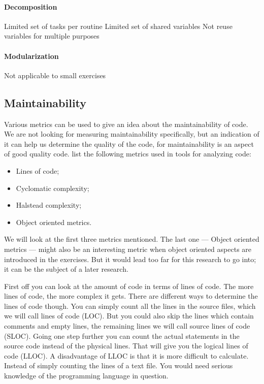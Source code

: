 \paragraph{Decomposition}
Limited set of tasks per routine
Limited set of shared variables
Not reuse variables for multiple purposes

\paragraph{Modularization}
Not applicable to small exercises

\subsection{Maintainability}

Various metrics can be used to give an idea about the maintainability of
code. We are not looking for measuring maintainability specifically, but an
indication of it can help us determine the quality of the code, for
maintainability is an aspect of good quality code. \citet{rakic2013problems}
list the following metrics used in tools for analyzing code:
\begin{itemize}
  \item Lines of code;
  \item Cyclomatic complexity;
  \item Halstead complexity;
  \item Object oriented metrics.
\end{itemize}
We will look at the first three metrics mentioned. The last one --- Object
oriented metrics --- might also be an interesting metric when object oriented
aspects are introduced in the exercises. But it would lead too far for this
research to go into; it can be the subject of a later research.

First off you can look at the amount of code in terms of lines of code.
The more lines of code, the more complex it gets. There are different
ways to determine the lines of code though.
You can simply count all the lines in the
source files, which we will call lines of code (LOC). But you could also skip
the lines which contain comments and empty lines, the remaining lines we will
call source lines of code (SLOC). Going one step further you can count the
actual statements in the source code instead of the physical lines. That will
give you the logical lines of code (LLOC). A disadvantage of LLOC is that it is
more difficult to calculate. Instead of simply counting the lines of a text
file. You would need serious knowledge of the programming language in question.

